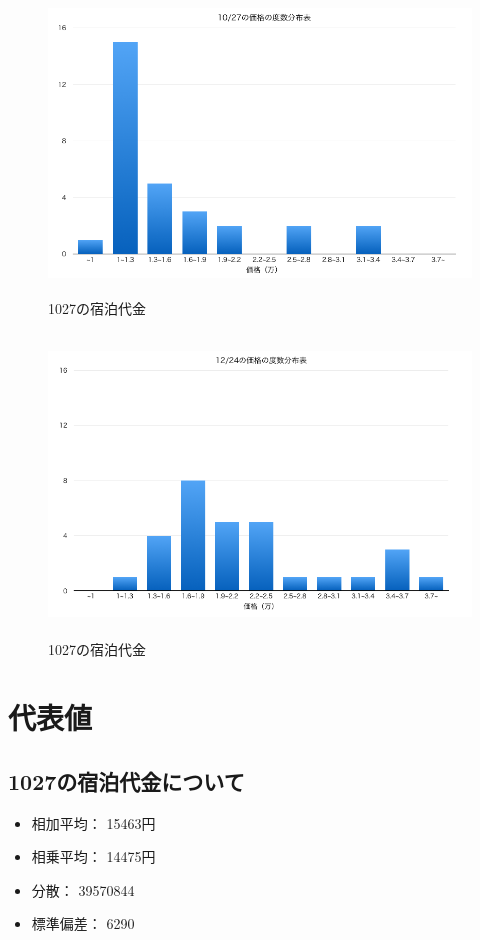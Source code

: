 \documentclass[11pt,a4j]{jsarticle}
\makeatletter
\newcommand{\figcaption}[1]{\def\@captype{figure}\caption{#1}}
\makeatother
\begin{document}
\begin{figure}[H]
  \centering
  \includegraphics[height=80mm,bb=0 0 823 523]{img/1027.png}
  \figcaption{1027の宿泊代金}
  \label{fig:1027}
\end{figure}

\begin{figure}[H]
  \centering
  \includegraphics[height=80mm,bb=0 0 841 528]{img/1224.png}
  \figcaption{1027の宿泊代金}
  \label{fig:1027}
\end{figure}

\section{代表値}

\subsection{1027の宿泊代金について}

\begin{itemize}
  \item 相加平均： 15463円
  \item 相乗平均： 14475円
  \item 分散： 39570844
  \item 標準偏差： 6290
\end{itemize}
\end{document}
